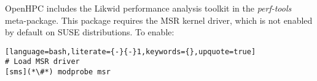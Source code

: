 \begin{center}
\begin{tcolorbox}[]
\small
OpenHPC includes the Likwid performance analysis toolkit in the {\em perf-tools} meta-package. This package 
requires the MSR kernel driver, which is not enabled by default on SUSE distributions. To enable:
\begin{lstlisting}[language=bash,literate={-}{-}1,keywords={},upquote=true]
# Load MSR driver
[sms](*\#*) modprobe msr
\end{lstlisting}
\end{tcolorbox}
\end{center}


